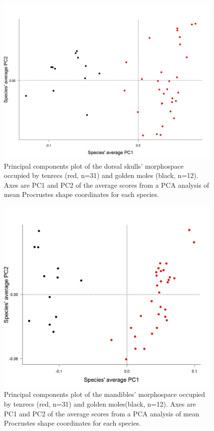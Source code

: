 \documentclass[12pt,a4paper]{article}
\begin{document}
\begin{figure}[H]
\centering
\includegraphics[width=1\linewidth]{figures/SkDors_Tenrecs+Gmoles_PC1PC2_01_05.jpg}
\caption{Principal components plot of the dorsal skulls' morphospace occupied by tenrecs (red, n=31) and golden moles (black, n=12). Axes are PC1 and PC2 of the average scores from a PCA analysis of mean Procrustes shape coordinates for each species. }
\label{fig:skdorsPCA}
\end{figure}


\begin{figure}[H]
\centering
\includegraphics[width=1\linewidth]{figures/Mands_Tenrecs+Gmoles_PC1PC2_01_05_14.jpg}
\caption{Principal components plot of the mandibles' morphospace occupied by tenrecs (red, n=31) and golden moles(black, n=12). Axes are PC1 and PC2 of the average scores from a PCA analysis of mean Procrustes shape coordinates for each species. }
\label{fig:mandsPCA}

\end{figure}
\end{document}
